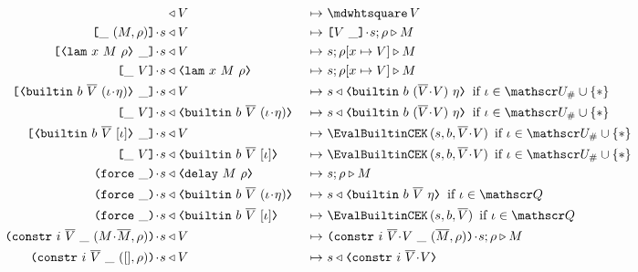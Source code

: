 \begin{figure}[H]
\begin{subfigure}[c]{\linewidth}
\begin{minipage}{\linewidth}
\begin{alignat*}{2}
[] & \return V                                    &~\mapsto~& \cekhalt{V}\\
\inAppLeftFrame{(M,\rho)}  \cons s            & \return V  &~\mapsto~& \inAppRightFrame{V} \cons s;\rho \compute M\\
\inAppRightFrame{\VLamAbs{x}{M}{\rho}} \cons s   & \return V  &~\mapsto~& s;\rho[x \mapsto V] \compute M\\
\inAppLeftFrame{V} \cons s   & \return \VLamAbs{x}{M}{\rho}  &~\mapsto~& s;\rho[x \mapsto V] \compute M\\
\inAppRightFrame{\VBuiltin{b}{\repetition{V}}{(\iota \cons \eta)}} \cons s & \return V &~\mapsto~&
                         s \return \VBuiltin{b}{(\repetition{V} \snoc V)}{\eta} \enskip \text{if $\iota \in \Unihash \cup \VarStar$}\\
\inAppLeftFrame{V} \cons s & \return \VBuiltin{b}{\repetition{V}}{(\iota \cons \eta)} &~\mapsto~&
                         s \return \VBuiltin{b}{(\repetition{V} \snoc V)}{\eta} \enskip \text{if $\iota \in \Unihash \cup \VarStar$}\\
\inAppRightFrame{\VBuiltin{b}{\repetition{V}}{[\iota]}} \cons s  & \return V &~\mapsto~&
                         \EvalBuiltinCEK\,(s, b, \repetition{V}\snoc V) \enskip \text{if $\iota \in \Unihash \cup \VarStar$}\\
\inAppLeftFrame{V} \cons s & \return \VBuiltin{b}{\repetition{V}}{[\iota]} &~\mapsto~&
                         \EvalBuiltinCEK\,(s, b, \repetition{V}\snoc V) \enskip \text{if $\iota \in \Unihash \cup \VarStar$}\\
\inForceFrame{} \cons s & \return \VDelay{M}{\rho}         &~\mapsto~& s;\rho \compute M\\
\inForceFrame{} \cons s & \return \VBuiltin{b}{\repetition{V}}{(\iota \cons \eta)} &~\mapsto~&
                         s \return \VBuiltin{b}{\repetition{V}}{\eta} \enskip \text{if $\iota \in \QVar$}\\
\inForceFrame{} \cons s & \return \VBuiltin{b}{\repetition{V}}{[\iota]}   &~\mapsto~&
                         \EvalBuiltinCEK\,(s, b, \repetition{V}) \enskip \text{if $\iota \in \QVar$}\\
\inConstrFrame{i}{\repetition{V}}{(M \cons \repetition{M}, \rho)} \cons s & \return V   &~\mapsto~&
                         \inConstrFrame{i}{\repetition{V} \cons V}{(\repetition{M}, \rho)} \cons s;\rho \compute M \\
\inConstrFrame{i}{\repetition{V}}{([], \rho)} \cons s & \return V   &~\mapsto~&
                         s \return \VConstr{i}{\repetition{V} \cons V} \\

\end{alignat*}
\end{minipage}
\end{subfigure}
\end{figure}
